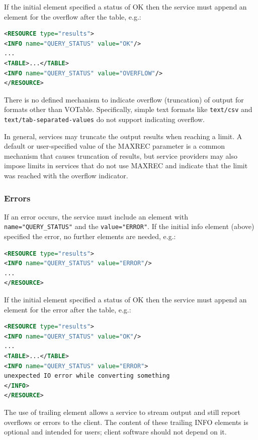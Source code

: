 \documentclass[11pt,letter]{ivoa}
\begin{document}
If the initial  element specified a status of OK then the service must
append an  element for the overflow after the table, e.g.:

\begin{lstlisting}[language=XML]
<RESOURCE type="results">
<INFO name="QUERY_STATUS" value="OK"/>
...
<TABLE>...</TABLE>
<INFO name="QUERY_STATUS" value="OVERFLOW"/>
</RESOURCE>
\end{lstlisting}

There is no defined mechanism to indicate overflow (truncation) of output for formats
other than VOTable. Specifically, simple text formats like \verb|text/csv| and
\verb|text/tab-separated-values| do not support indicating overflow.

In general, services may truncate the output results when reaching a limit. A default or
user-specified value of the MAXREC parameter is a common mechanism that causes truncation
of results, but service providers may also impose limits in services that do not use
MAXREC and indicate that the limit was reached with the overflow indicator.


\subsubsection{Errors}
\label{sect:errors}

If an error occurs, the service must include an  element with
\verb|name="QUERY_STATUS"| and the \verb|value="ERROR"|. If the initial info element (above)
specified the error, no further elements are needed, e.g.:

\begin{lstlisting}[language=XML]
<RESOURCE type="results">
<INFO name="QUERY_STATUS" value="ERROR"/>
...
</RESOURCE>
\end{lstlisting}

If the initial  element specified a status of OK then the service must
append an  element for the error after the table, e.g.:

\begin{lstlisting}[language=XML]
<RESOURCE type="results">
<INFO name="QUERY_STATUS" value="OK"/>
...
<TABLE>...</TABLE>
<INFO name="QUERY_STATUS" value="ERROR">
unexpected IO error while converting something
</INFO>
</RESOURCE>
\end{lstlisting}

The use of trailing  element allows a service to stream output and still
report overflows or errors to the client. The content of these trailing INFO
elements is optional and intended for users; client software should not depend
on it.
\end{document}
